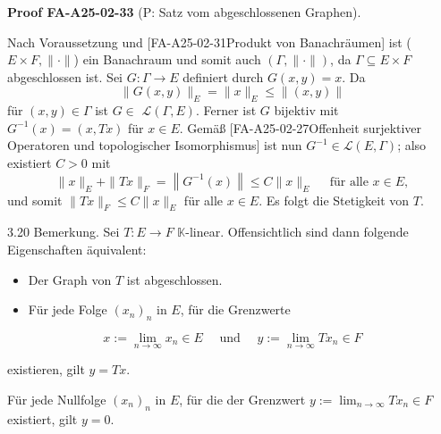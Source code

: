 \documentclass[10pt, letterpaper]{article}
\newcommand{\CustomHeading}[3]{%
  \par\medskip\noindent%
  \textbf{#1 #2} \textnormal{(#3)}.\enskip%
}
\newenvironment{PROOF}[2]{\begin{unitbox}\CustomHeading{Proof}{#1}{#2}}{\end{unitbox}}
\begin{document}
\begin{PROOF}{FA-A25-02-33}{P: Satz vom abgeschlossenen Graphen}
Nach Voraussetzung und [{FA-A25-02-31}{Produkt von Banachräumen}] ist ($E \times F,\|\cdot\|$) ein Banachraum und somit auch $(\Gamma,\|\cdot\|)$, da $\Gamma \subseteq E \times F$ abgeschlossen ist. Sei $G: \Gamma \rightarrow E$ definiert durch $G(x, y)=x$. Da 
$$\|G(x, y)\|_{E}=\|x\|_{E} \leq\|(x, y)\|$$ 
für $(x, y) \in \Gamma$ ist $G \in$ $\mathcal{L}(\Gamma, E)$. Ferner ist $G$ bijektiv mit $G^{-1}(x)=(x, T x)$ für $x \in E$. Gemäß [{FA-A25-02-27}{Offenheit surjektiver Operatoren und topologischer Isomorphismus}] ist nun $G^{-1} \in \mathcal{L}(E, \Gamma)$; also existiert $C>0$ mit
$$
\|x\|_{E}+\|T x\|_{F}=\left\|G^{-1}(x)\right\| \leq C\|x\|_{E} \quad \text { für alle } x \in E,
$$
und somit $\|T x\|_{F} \leq C\|x\|_{E}$ für alle $x \in E$. Es folgt die Stetigkeit von $T$.
\end{PROOF}


3.20 Bemerkung. Sei $T: E \rightarrow F$  $\mathbb{K}$-linear. Offensichtlich sind dann folgende Eigenschaften äquivalent:

\begin{itemize}
  \item Der Graph von $T$ ist abgeschlossen.
  \item Für jede Folge $\left(x_{n}\right)_{n}$ in $E$, für die Grenzwerte
\end{itemize}

$$
x:=\lim _{n \rightarrow \infty} x_{n} \in E \quad \text { und } \quad y:=\lim _{n \rightarrow \infty} T x_{n} \in F
$$

existieren, gilt $y=T x$.

Für jede Nullfolge $\left(x_{n}\right)_{n}$ in $E$, für die der Grenzwert $y:=\lim _{n \rightarrow \infty} T x_{n} \in F$ existiert, gilt $y=0$.
  
  
\end{document}
